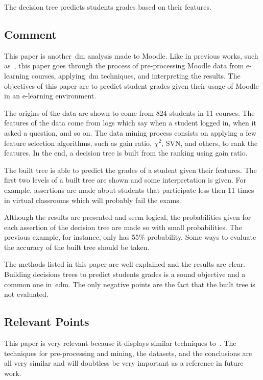 The decision tree predicts students grades based on their features.

\subsection{Comment}

This paper is another~\gls{dm} analysis made to Moodle. Like in previous works,
such as~\cite{ind_002, ind_004}, this paper goes through the process of
pre-processing Moodle data from e-learning courses, applying~\gls{dm}
techniques, and interpreting the results. The objectives of this paper are to
predict student grades given their usage of Moodle in an e-learning
environment.

The origins of the data are shown to come from 824 students in 11 courses. The
features of the data come from logs which say when a student logged in, when it
asked a question, and so on. The data mining process consists on applying a few
feature selection algorithms, such as gain ratio, $ \chi^2 $, SVN, and others,
to rank the features. In the end, a decision tree is built from the ranking
using gain ratio.

The built tree is able to predict the grades of a student given their features.
The first two levels of a built tree are shown and some interpretation is
given. For example, assertions are made about students that participate less
then 11 times in virtual classrooms which will probably fail the exams.

Although the results are presented and seem logical, the probabilities given
for each assertion of the decision tree are made so with small probabilities.
The previous example, for instance, only has 55\% probability. Some ways to
evaluate the accuracy of the built tree should be taken.

The methods listed in this paper are well explained and the results are clear.
Building decisions trees to predict students grades is a sound objective and a
common one in~\gls{edm}. The only negative points are the fact that the built
tree is not evaluated.

\subsection{Relevant Points}

This paper is very relevant because it displays similar techniques
to~\cite{ind_002, ind_004}. The techniques for pre-processing and mining, the
datasets, and the conclusions are all very similar and will doubtless be very
important as a reference in future work.

